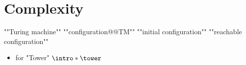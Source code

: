 \section{Complexity}

\begin{itemize}
	\itemAP ""Turing machine""
	\itemAP ""configuration@@TM""
	\itemAP ""initial configuration""
	\itemAP ""reachable configuration""
\end{itemize}

\begin{itemize}
	\itemAP ""Connectivity in Finite Graphs""
	\itemAP ""Reachability in Finite Graphs""
	\itemAP ""computationally equivalent""
	\itemAP ""data complexity""
	\item \cite{Schmitz2016ComplexityHierarchies} for "Tower" $\intro*\tower$
\end{itemize}